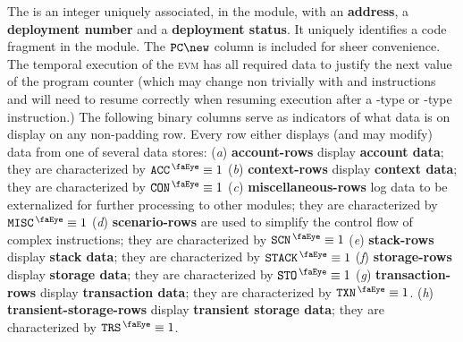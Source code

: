 The \CFI{} is an integer uniquely associated, in the \romLexMod{} module, with an \textbf{address}, a \textbf{deployment number} and a \textbf{deployment status}. It uniquely identifies a code fragment in the \romMod{} module. The $\pc\new$ column is included for sheer convenience. The temporal execution of the \textsc{evm} has all required data to justify the next value of the program counter (which may change non trivially with  and  instructions and will need to resume correctly when resuming execution after a -type or -type instruction.)
The following binary columns serve as indicators of what data is on display on any non-padding row. Every row either displays (and may modify) data from one of several data stores:
(\emph{a}) \textbf{account-rows} display \textbf{account data};                                             they are characterized by $\peekAccount     \equiv 1$
(\emph{b}) \textbf{context-rows} display \textbf{context data};                                             they are characterized by $\peekContext     \equiv 1$
(\emph{c}) \textbf{miscellaneous-rows} log data to be externalized for further processing to other modules; they are characterized by $\peekMisc        \equiv 1$
(\emph{d}) \textbf{scenario-rows} are used to simplify the control flow of complex instructions;            they are characterized by $\peekScenario    \equiv 1$
(\emph{e}) \textbf{stack-rows} display \textbf{stack data};                                                 they are characterized by $\peekStack       \equiv 1$
(\emph{f}) \textbf{storage-rows} display \textbf{storage data};                                             they are characterized by $\peekStorage     \equiv 1$
(\emph{g}) \textbf{transaction-rows} display \textbf{transaction data};                                     they are characterized by $\peekTransaction \equiv 1$.
(\emph{h}) \textbf{transient-storage-rows} display \textbf{transient storage data};                         they are characterized by $\peekTransient   \equiv 1$.
